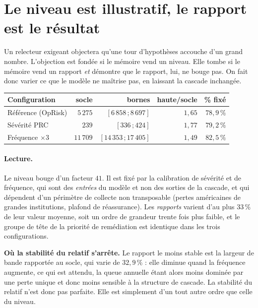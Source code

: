 
\section{Le niveau est illustratif, le rapport est le résultat}

Un relecteur exigeant objectera qu'une tour d'hypothèses accouche d'un grand nombre.
L'objection est fondée si le mémoire vend un niveau. Elle tombe si le mémoire vend un
rapport \emph{et} démontre que le rapport, lui, ne bouge pas. On fait donc varier ce que
le modèle ne maîtrise pas, en laissant la cascade inchangée.

\begin{center}\footnotesize
\renewcommand{\arraystretch}{1.25}
\begin{tabular}{@{}p{4.3cm} r r r r@{}}
\toprule
\textbf{Configuration} & \textbf{socle} & \textbf{bornes} &
\textbf{haute/socle} & \textbf{\% fixé} \\
\midrule
Référence (OpRisk)   & $5\,275$  & $[6\,858\,;8\,697]$   & $1{,}65$ & $78{,}9\,\%$ \\
Sévérité PRC         & $239$     & $[336\,;424]$         & $1{,}77$ & $79{,}2\,\%$ \\
Fréquence $\times 3$ & $11\,709$ & $[14\,353\,;17\,405]$ & $1{,}49$ & $82{,}5\,\%$ \\
\bottomrule
\end{tabular}
\end{center}

\paragraph{Lecture.} Le niveau bouge d'un facteur $41$. Il est fixé par la
calibration de sévérité et de fréquence, qui sont des \emph{entrées} du modèle et non des
sorties de la cascade, et qui dépendent d'un périmètre de collecte non transposable
(pertes américaines de grandes institutions, plafond de réassurance). Les
\emph{rapports} varient d'au plus $33\,\%$ de leur valeur moyenne, soit un ordre de
grandeur trente fois plus faible, et le groupe de tête de la priorité de
remédiation est identique dans les trois configurations.

\begin{attention}
\textbf{Où la stabilité du relatif s'arrête.} Le rapport le moins
stable est la largeur de bande rapportée au socle, qui varie de $32{,}9\,\%$ : elle
diminue quand la fréquence augmente, ce qui est attendu, la queue annuelle étant alors
moins dominée par une perte unique et donc moins sensible à la structure de cascade. La
stabilité du relatif n'est donc pas parfaite. Elle est simplement d'un tout autre ordre
que celle du niveau.
\end{attention}

